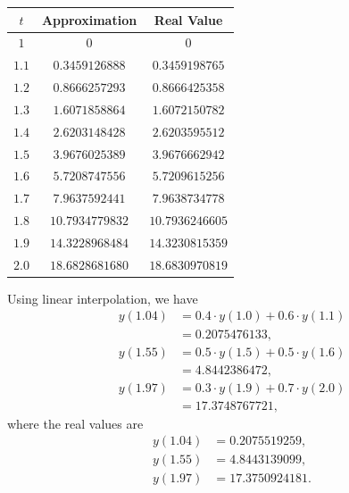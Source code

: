 \documentclass[11pt]{article}
\theoremstyle{break}
\numberwithin{equation}{theorem}
\begin{document}
\begin{enumerate}
\begin{center}
\begin{tabular}{|c|c|c|}
            \hline
            $t$ & Approximation & Real Value \\
            \hline
            $1$ & $0$ & $0$ \\
            \hline
            $1.1$ & $0.3459126888$ & $0.3459198765$ \\
            \hline
            $1.2$ & $0.8666257293$ & $0.8666425358$ \\
            \hline
            $1.3$ & $1.6071858864$ & $1.6072150782$ \\
            \hline
            $1.4$ & $2.6203148428$ & $2.6203595512$ \\
            \hline
            $1.5$ & $3.9676025389$ & $3.9676662942$ \\
            \hline
            $1.6$ & $5.7208747556$ & $5.7209615256$ \\
            \hline
            $1.7$ & $7.9637592441$ & $7.9638734778$ \\
            \hline
            $1.8$ & $10.7934779832$ & $10.7936246605$ \\
            \hline
            $1.9$ & $14.3228968484$ & $14.3230815359$ \\
            \hline
            $2.0$ & $18.6828681680$ & $18.6830970819$ \\
            \hline
        \end{tabular}
    \end{center}
    Using linear interpolation, we have 
    \begin{align*}
        y(1.04)&=0.4\cdot y(1.0)+0.6\cdot y(1.1)\\
        &=0.2075476133,\\
        y(1.55)&=0.5\cdot y(1.5)+0.5\cdot y(1.6)\\
        &=4.8442386472,\\
        y(1.97)&=0.3\cdot y(1.9)+0.7\cdot y(2.0)\\
        &=17.3748767721,
    \end{align*}
    where the real values are
    \begin{align*}
        y(1.04)&=0.2075519259,\\
        y(1.55)&=4.8443139099,\\
        y(1.97)&=17.3750924181.
    \end{align*}
\end{enumerate}
\end{document}
